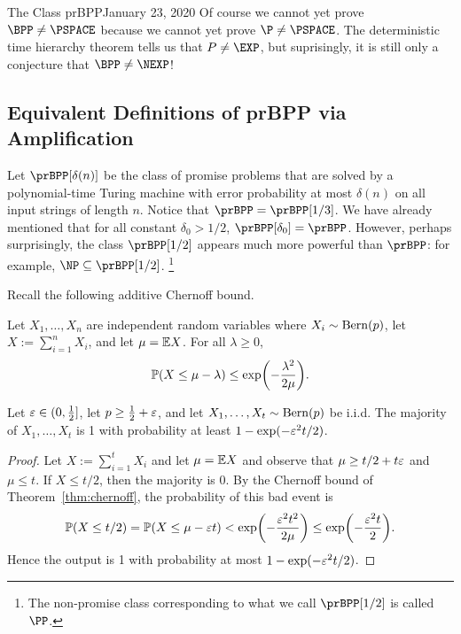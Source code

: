 \begin{lecture}{1}{The Class prBPP}{January 23, 2020}
Of course we cannot yet prove $\BPP \ne \PSPACE$ because we cannot yet prove
$\P \ne \PSPACE$. The deterministic time hierarchy theorem tells us that $P \ne
\EXP$, but suprisingly, it is still only a conjecture that $\BPP \ne \NEXP$!

\subsection{Equivalent Definitions of prBPP via Amplification}

Let $\prBPP[\delta(n)]$ be the class of promise problems that are solved by a
polynomial-time Turing machine with error probability at most $\delta(n)$ on
all input strings of length $n$. Notice that $\prBPP = \prBPP[1/3]$. We have
already mentioned that for all constant $\delta_0 > 1/2$, $\prBPP[\delta_0] =
\prBPP$. However, perhaps surprisingly, the class $\prBPP[1/2]$ appears much
more powerful than $\prBPP$: for example, $\NP \subseteq \prBPP[1/2]$.%
\footnote{The non-promise class corresponding to what we call $\prBPP[1/2]$ is
called $\PP$.}

Recall the following additive Chernoff bound.

\begin{theorem}\label{thm:chernoff}
  Let $X_1, \dots, X_n$ are independent random variables where $X_i \sim
  \operatorname{Bern}(p)$, let $X := \sum_{i=1}^n X_i$, and let $\mu = \mathbb{E} X$. For all
  $\lambda \ge 0$, \[
    \Pr\paren*{X \le \mu - \lambda} \le \exp\paren*{-\frac{\lambda^2}{2\mu}}.
  \]
\end{theorem}

\begin{proposition}\label{prop:maj}
  Let $\varepsilon \in (0, \frac{1}{2}]$, let $p \ge \frac{1}{2} + \varepsilon$, and let $X_1,
  \dots, X_t \sim \operatorname{Bern}(p)$ be i.i.d. The majority of $X_1, \dots, X_t$ is 1
  with probability at least $1 - \exp(-\varepsilon^2 t/2)$.
\end{proposition}

\begin{proof}
  Let $X := \sum_{i=1}^t X_i$ and let $\mu = \mathbb{E} X$ and observe that $\mu \ge
  t/2 + t\varepsilon$ and $\mu \le t$. If $X \le t/2$, then the majority is 0. By the
  Chernoff bound of Theorem~\ref{thm:chernoff}, the probability of this bad
  event is \[
    \Pr(X \le t/2) = \Pr(X \le \mu - \eps t) < \exp\paren*{-\frac{\eps^2t^2}{2\mu}} \le \exp\paren*{-\frac{\eps^2t}{2}}.
  \]
  Hence the output is 1 with probability at most $1 - \exp(-\varepsilon^2 t/2)$.
\end{proof}


\end{lecture}

